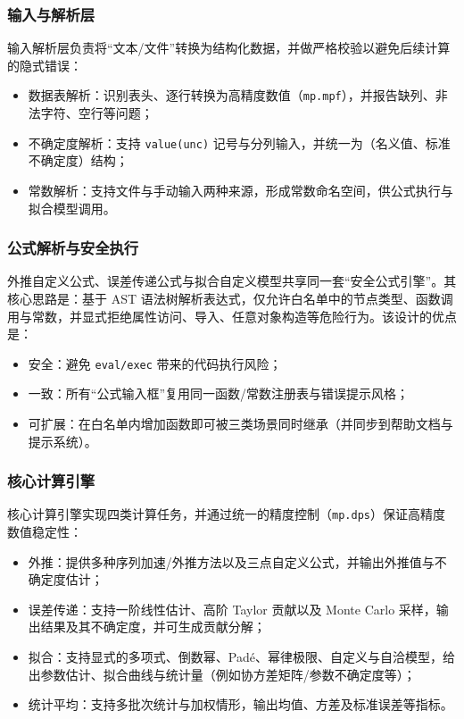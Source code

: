 \documentclass[UTF8,a4paper,11pt]{ctexart}
\begin{document}
\subsubsection{输入与解析层}
输入解析层负责将“文本/文件”转换为结构化数据，并做严格校验以避免后续计算的隐式错误：
\begin{itemize}
  \item 数据表解析：识别表头、逐行转换为高精度数值（\texttt{mp.mpf}），并报告缺列、非法字符、空行等问题；
  \item 不确定度解析：支持 \texttt{value(unc)} 记号与分列输入，并统一为（名义值、标准不确定度）结构；
  \item 常数解析：支持文件与手动输入两种来源，形成常数命名空间，供公式执行与拟合模型调用。
\end{itemize}

\subsubsection{公式解析与安全执行}
外推自定义公式、误差传递公式与拟合自定义模型共享同一套“安全公式引擎”。其核心思路是：基于 AST 语法树解析表达式，仅允许白名单中的节点类型、函数调用与常数，并显式拒绝属性访问、导入、任意对象构造等危险行为。该设计的优点是：
\begin{itemize}
  \item 安全：避免 \texttt{eval/exec} 带来的代码执行风险；
  \item 一致：所有“公式输入框”复用同一函数/常数注册表与错误提示风格；
  \item 可扩展：在白名单内增加函数即可被三类场景同时继承（并同步到帮助文档与提示系统）。
\end{itemize}

\subsubsection{核心计算引擎}
核心计算引擎实现四类计算任务，并通过统一的精度控制（\texttt{mp.dps}）保证高精度数值稳定性：
\begin{itemize}
  \item 外推：提供多种序列加速/外推方法以及三点自定义公式，并输出外推值与不确定度估计；
  \item 误差传递：支持一阶线性估计、高阶 Taylor 贡献以及 Monte Carlo 采样，输出结果及其不确定度，并可生成贡献分解；
  \item 拟合：支持显式的多项式、倒数幂、Padé、幂律极限、自定义与自洽模型，给出参数估计、拟合曲线与统计量（例如协方差矩阵/参数不确定度等）；
  \item 统计平均：支持多批次统计与加权情形，输出均值、方差及标准误差等指标。
\end{itemize}
\end{document}
